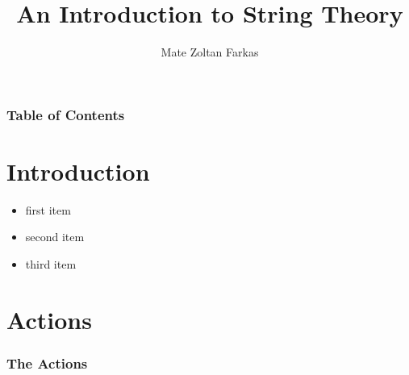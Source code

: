 \documentclass[11pt,aspectratio=169]{beamer}
\begin{document}
	\author{Mate Zoltan Farkas}
	\title{An Introduction to String Theory}
	
	\begin{frame}[plain]
		\maketitle
	\end{frame}
	
	\begin{frame}
		\frametitle{Table of Contents}
		\tableofcontents
	\end{frame}

	\section{Introduction}
	
	\begin{frame}
		\begin{itemize}
			\item<1,2,3>first item
			\item<2,3>second item
			\item<3>third item
		\end{itemize}	
	\end{frame}

	\section{Actions}
	
	\begin{frame}
		\frametitle{The Actions}
	\end{frame}
\end{document}
